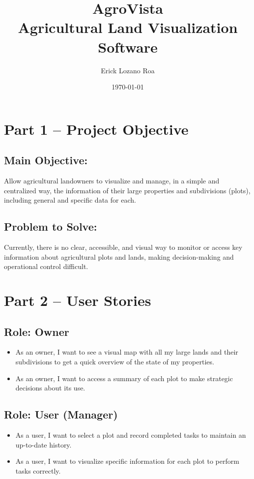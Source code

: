 \documentclass[12pt]{article}
\title{AgroVista \\ Agricultural Land Visualization Software}
\author{Erick Lozano Roa}
\date{\today}
\begin{document}
\maketitle

\section{Part 1 – Project Objective}

\subsection{Main Objective:} Allow agricultural landowners to visualize and manage, in a simple and centralized way, the information of their large properties and subdivisions (plots), including general and specific data for each.

\subsection{Problem to Solve:} Currently, there is no clear, accessible, and visual way to monitor or access key information about agricultural plots and lands, making decision-making and operational control difficult.

\section{Part 2 – User Stories}

\subsection*{Role: Owner}
\begin{itemize}[label=--]
  \item As an owner, I want to see a visual map with all my large lands and their subdivisions to get a quick overview of the state of my properties.
  \item As an owner, I want to access a summary of each plot to make strategic decisions about its use.
\end{itemize}

\subsection*{Role: User (Manager)}
\begin{itemize}[label=--]
  \item As a user, I want to select a plot and record completed tasks to maintain an up-to-date history.
  \item As a user, I want to visualize specific information for each plot to perform tasks correctly.
\end{itemize}
\end{document}
